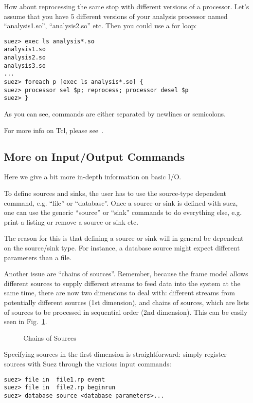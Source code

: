 \documentclass[12pt]{article}
\def\displayepsf#1#2#3#4{ %
   \begin{figure}[#1]
   \setlength{\epsfysize}{#3in}
   \centerline{\epsffile{#2}}
   \caption{#4}
   \end{figure}}
\begin{document}
How about reprocessing the same stop with different versions of a
processor. Let's assume that you have 5 different versions of your
analysis processor named ``analysis1.so'', ``analysis2.so'' etc.
Then you could use a for loop:
%
\begin{verbatim}
suez> exec ls analysis*.so
analysis1.so
analysis2.so
analysis3.so
...
suez> foreach p [exec ls analysis*.so] {
suez> processor sel $p; reprocess; processor desel $p 
suez> }
\end{verbatim}
%
As you can see, commands are either separated by newlines or semicolons.

For more info on Tcl, please see~\cite{TclInfo}.

\subsection{More on Input/Output Commands }
\label{sec:MoreIO}

Here we give a bit more in-depth information on basic I/O.

To define sources and sinks, the user has to use the source-type
dependent command, e.g. ``file'' or ``database''. Once a source or sink
is defined with suez, one can use the generic ``source'' or ``sink''
commands to do everything else, e.g. print a listing  or remove a source
or sink etc.

The reason for this is that defining a source or sink will in general be
dependent on the source/sink type. For instance, a database source might
expect different parameters than a file.

Another issue are ``chains of sources''. Remember, because the frame
model allows different sources to supply different streams to feed data
into the system at the same time, there are now two dimensions to deal
with: different streams from potentially different sources (1st
dimension), and chains of sources, which are lists of sources to be
processed in sequential order (2nd dimension). This can be easily seen
in Fig.~\ref{fig:ChainsOfSources}.
%
\displayepsf{h}{DataInput.eps}{1.1}{Chains of Sources
\label{fig:ChainsOfSources}}

Specifying sources in the first dimension is straightforward: simply
register sources with Suez through the various input commands:
\begin{verbatim}
suez> file in  file1.rp event
suez> file in  file2.rp beginrun
suez> database source <database parameters>...
\end{verbatim}
\end{document}
